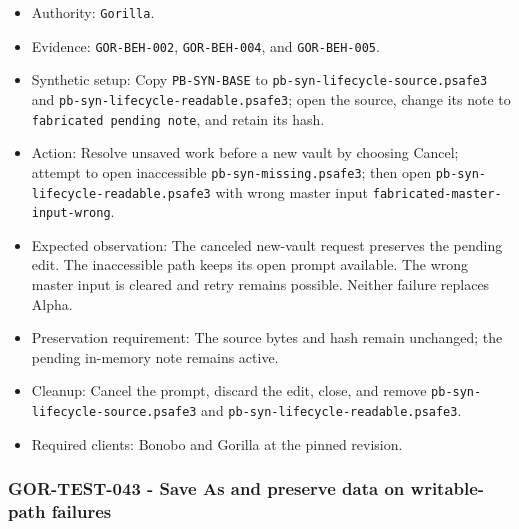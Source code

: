 \documentclass[
  letterpaper,
]{article}
\newcommand{\passthrough}[1]{#1}
\providecommand{\tightlist}{%
  \setlength{\itemsep}{0pt}\setlength{\parskip}{0pt}}
\begin{document}
\begin{itemize}
\tightlist
\item
  Authority: \passthrough{\lstinline!Gorilla!}.
\item
  Evidence: \nolinkurl{GOR-BEH-002}, \nolinkurl{GOR-BEH-004}, and \nolinkurl{GOR-BEH-005}.
\item
  Synthetic setup: Copy \nolinkurl{PB-SYN-BASE} to \nolinkurl{pb-syn-lifecycle-source.psafe3} and
  \nolinkurl{pb-syn-lifecycle-readable.psafe3}; open the source, change its note to
  \passthrough{\lstinline!fabricated pending note!}, and retain its hash.
\item
  Action: Resolve unsaved work before a new vault by choosing Cancel; attempt to open inaccessible
  \nolinkurl{pb-syn-missing.psafe3}; then open \nolinkurl{pb-syn-lifecycle-readable.psafe3} with wrong master input
  \nolinkurl{fabricated-master-input-wrong}.
\item
  Expected observation: The canceled new-vault request preserves the pending edit. The inaccessible path keeps its open
  prompt available. The wrong master input is cleared and retry remains possible. Neither failure replaces Alpha.
\item
  Preservation requirement: The source bytes and hash remain unchanged; the pending in-memory note remains active.
\item
  Cleanup: Cancel the prompt, discard the edit, close, and remove \nolinkurl{pb-syn-lifecycle-source.psafe3} and
  \nolinkurl{pb-syn-lifecycle-readable.psafe3}.
\item
  Required clients: Bonobo and Gorilla at the pinned revision.
\end{itemize}

\subsubsection{GOR-TEST-043 - Save As and preserve data on writable-path
failures}\label{gor-test-043---save-as-and-preserve-data-on-writable-path-failures}
\end{document}
